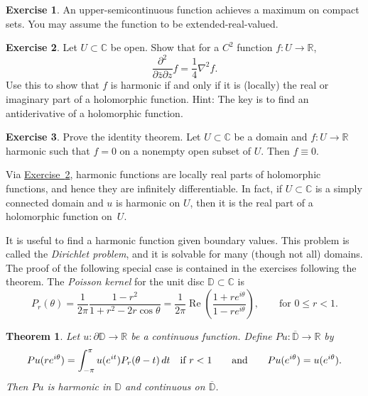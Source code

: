 \documentclass[12pt,openany]{book}
\newcommand{\avoidbreak}{\postdisplaypenalty=100}
\newcommand{\C}{{\mathbb{C}}}
\newcommand{\R}{{\mathbb{R}}}
\newcommand{\D}{{\mathbb{D}}}
\newcommand{\myindex}[1]{#1\index{#1}}
\theoremstyle{plain}
\newtheorem{thm}{Theorem}[section]
\theoremstyle{remark}
\theoremstyle{definition}
\newenvironment{exbox}{%
    \def\FrameCommand{\vrule width 1pt \relax\hspace{10pt}}%
    \MakeFramed{\advance\hsize-\width\FrameRestore}%
}{%
    \endMakeFramed
}
\theoremstyle{exercise}
\newtheorem{exercise}{Exercise}[section]
\theoremstyle{example}
\newcommand{\exerciseref}[1]{\hyperref[#1]{Exercise~\ref*{#1}}}
\begin{document}
\begin{exbox}
\begin{exercise}
An upper-semicontinuous function achieves a maximum on compact sets.
You may assume the function to be extended-real-valued.
\end{exercise}

\begin{exercise} \label{exercise:harmonicrealimag}
Let $U \subset \C$ be open.
Show that for a $C^2$ function $f \colon U \to \R$,
\begin{equation*}
\frac{\partial^2}{\partial \bar{z}\partial z} f = \frac{1}{4} \nabla^2 f .
\end{equation*}
Use this to show that $f$ is harmonic if and only if it is
(locally) the real or imaginary part
of a holomorphic function.
Hint: The key is to find an antiderivative of a holomorphic function.
\end{exercise}

\begin{exercise}
Prove the identity theorem.  Let $U \subset \C$ be a domain
and $f \colon U \to \R$ harmonic such that $f=0$ on a nonempty open subset
of $U$.  Then $f\equiv 0$.
\end{exercise}
\end{exbox}

Via \exerciseref{exercise:harmonicrealimag},
harmonic functions are locally real parts of holomorphic functions,
and hence they are infinitely differentiable.
In fact,
if $U \subset \C$ is a simply connected domain and $u$ is harmonic on $U$,
then it is the real part of a holomorphic function on~$U$.

It is useful to find a harmonic function given boundary values.
This problem is called the \emph{\myindex{Dirichlet problem}}, and it is
solvable for many (though not all) domains.
The proof of the following special case is contained in the exercises
following the theorem.
The
\emph{\myindex{Poisson kernel}} for the unit disc $\D \subset \C$ is
%
\begin{equation*}
P_r(\theta)
= \frac{1}{2\pi} \frac{1-r^2}{1+r^2-2r \cos \theta}
= \frac{1}{2\pi}
\operatorname{Re} \left( \frac{1+re^{i\theta}}{1-re^{i\theta}}\right) ,
\qquad \text{for $0 \leq r < 1$.}
\end{equation*}

\begin{thm} \label{thm:dirichsol}
Let $u \colon \partial \D \to \R$ be a continuous function.
Define
$Pu \colon \overline{\D} \to \R$ by
\begin{equation*}
Pu(re^{i\theta})
=
\int_{-\pi}^\pi u(e^{it}) P_r(\theta-t) \, dt
\quad \text{if $r < 1$} \qquad \text{and} \qquad
Pu(e^{i\theta}) = u(e^{i\theta}).
\avoidbreak
\end{equation*}
Then $Pu$ is harmonic in $\D$ and continuous on $\overline{\D}$.
\end{thm}
\end{document}
